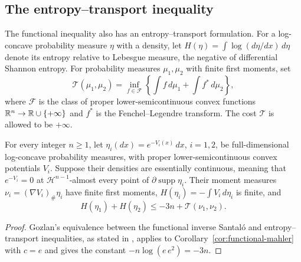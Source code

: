 \subsection{The entropy--transport inequality}

The functional inequality also has an entropy--transport formulation.
For a log-concave probability measure $\eta$ with a density, let
$H(\eta)=\int\log(d\eta/dx)\,d\eta$ denote its entropy relative to
Lebesgue measure, the negative of differential Shannon entropy.
For probability measures $\mu_1,\mu_2$ with finite first moments, set
\[
 \mathcal T(\mu_1,\mu_2)=
 \inf_{f\in\mathcal F}\left\{\int f\,d\mu_1+\int f^*\,d\mu_2\right\},
\]
where $\mathcal F$ is the class of proper lower-semicontinuous convex
functions $\mathbb R^n\to\mathbb R\cup\{+\infty\}$ and $f^*$ is the Fenchel--Legendre
transform. The cost $\mathcal T$ is allowed to be $+\infty$.

\begin{corollary}\label{cor:entropy-transport}
For every integer $n\ge1$, let $\eta_i(dx)=e^{-V_i(x)}\,dx$, $i=1,2$,
be full-dimensional log-concave probability measures, with proper
lower-semicontinuous convex potentials $V_i$. Suppose their densities
are essentially continuous, meaning that $e^{-V_i}=0$ at
$\mathcal H^{n-1}$-almost every point of
$\partial\operatorname{supp}\eta_i$. Their moment measures
$\nu_i=(\nabla V_i)_\#\eta_i$ have finite first moments,
$H(\eta_i)=-\int V_i\,d\eta_i$ is finite, and
\[
 H(\eta_1)+H(\eta_2)\le -3n+\mathcal T(\nu_1,\nu_2).
\]
\end{corollary}

\begin{proof}
Gozlan's equivalence between the functional inverse Santal\'o and
entropy--transport inequalities, as stated in
\cite[Theorem~1.3]{FradeliziGozlanZugmeyer2021}, applies to
Corollary~\ref{cor:functional-mahler} with $c=e$ and gives the constant
$-n\log(e\,e^2)=-3n$.
\end{proof}
